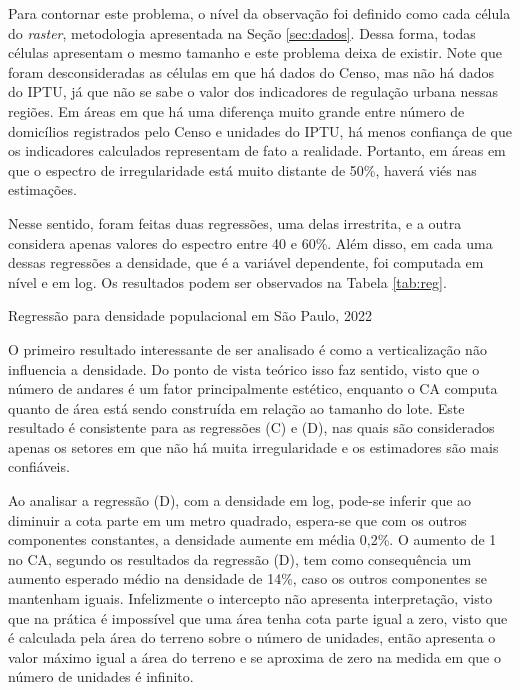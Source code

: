 Para contornar este problema, o nível da observação foi definido como cada célula do \textit{raster}, metodologia apresentada na Seção \ref{sec:dados}. Dessa forma, todas células apresentam o mesmo tamanho e este problema deixa de existir. Note que foram desconsideradas as células em que há dados do Censo, mas não há dados do IPTU, já que não se sabe o valor dos indicadores de regulação urbana nessas regiões. Em áreas em que há uma diferença muito grande entre número de domicílios registrados pelo Censo e unidades do IPTU, há menos confiança de que os indicadores calculados representam de fato a realidade. Portanto, em áreas em que o espectro de irregularidade está muito distante de 50\%, haverá viés nas estimações. 

Nesse sentido, foram feitas duas regressões, uma delas irrestrita, e a outra considera apenas valores do espectro entre 40 e 60\%. Além disso, em cada uma dessas regressões a densidade, que é a variável dependente, foi computada em nível e em log. Os resultados podem ser observados na Tabela \ref{tab:reg}. 

\begin{table}[h]
    \caption{Regressão para densidade populacional em São Paulo, 2022}
    
    \label{tab:reg}
    \addtocounter{table}{-1}
\end{table}

O primeiro resultado interessante de ser analisado é como a verticalização não influencia a densidade. Do ponto de vista teórico isso faz sentido, visto que o número de andares é um fator principalmente estético, enquanto o CA computa quanto de área está sendo construída em relação ao tamanho do lote. Este resultado é consistente para as regressões (C) e (D), nas quais são considerados apenas os setores em que não há muita irregularidade e os estimadores são mais confiáveis. 

Ao analisar a regressão (D), com a densidade em log, pode-se inferir que ao diminuir a cota parte em um metro quadrado, espera-se que com os outros componentes constantes, a densidade aumente em média 0,2\%. O aumento de 1 no CA, segundo os resultados da regressão (D), tem como consequência um aumento esperado médio na densidade de 14\%, caso os outros componentes se mantenham iguais. Infelizmente o intercepto não apresenta interpretação, visto que na prática é impossível que uma área tenha cota parte igual a zero, visto que é calculada pela área do terreno sobre o número de unidades, então apresenta o valor máximo igual a área do terreno e se aproxima de zero na medida em que o número de unidades é infinito. 

